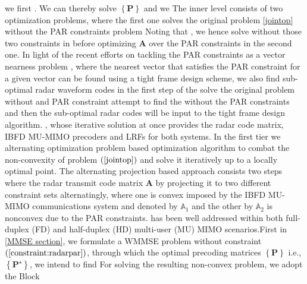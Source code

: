 \documentclass[10pt,journal]{IEEEtran}
\newcommand{\paren}[1]{\left({#1}\right)}
\newcommand{\braces}[1]{{\left\{ {#1}\right\}}}
\theoremstyle{definition}
\begin{document}

  
\iffalse
we first . We can thereby solve $\braces{\mathbf{P}}$  and we The inner level consists of two optimization problems, where the first one solves the original problem \eqref{jointop} without the PAR constraints  problem Noting that , we hence solve  without those two constraints in  before optimizing $\mathbf{A}$ over the PAR constraints in the second one. In light of the recent efforts on tackling the PAR constraints as a vector nearness problem \cite{NaghshTSP2017,nearestvector}, where the nearest vector that satisfies the PAR constraint for a given vector can be found using a tight frame design scheme, we also find sub-optimal radar waveform codes in the first step of the  solve the original problem without and PAR constraint attempt to find the  without the PAR constraints and then the sub-optimal radar codes will be input to the tight frame design algorithm.  , whose iterative solution at once provides the radar code matrix, IBFD MU-MIMO precoders and LRFs for both systems. In the first tier we alternating optimization problem  based optimization algorithm to combat the non-convexity of problem $\paren{\mathrm{\ref{jointop}}}$ and solve it iteratively up to a locally optimal point. The alternating projection based approach consists two steps where the radar transmit code matrix $\mathbf{A}$ by projecting it to two different constraint sets alternatingly, where one is convex imposed by the IBFD MU-MIMO communications system and denoted by $\mathbb{A}_1$ and the other by $\mathbb{A}_2$ is nonconvex due to the PAR constraints. has been well addressed within both full-duplex (FD) and half-duplex (HD) multi-user (MU) MIMO scenarios.First in \ref{MMSE section}, we formulate a WMMSE problem without constraint $\paren{\mathrm{\ref{constraint:radarpar}}}$, through which the optimal precoding matrices $\braces{\mathbf{P}}$ i.e., $\braces{\mathbf{P}^\star}$,  we intend to find 
For solving the resulting non-convex problem, we adopt the Block
\end{document}
